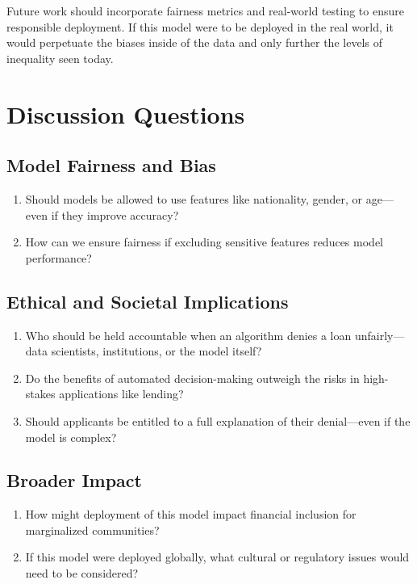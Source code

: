 \documentclass[12pt]{article}
\begin{document}
	Future work should incorporate fairness metrics and real-world testing to ensure responsible deployment. If this model were to be deployed in the real world, it would perpetuate the biases inside of the data and only further the levels of inequality seen today.
	
	\section{Discussion Questions}
	
	\subsection*{Model Fairness and Bias}
	\begin{enumerate}
		\item Should models be allowed to use features like nationality, gender, or age—even if they improve accuracy?
		\item How can we ensure fairness if excluding sensitive features reduces model performance?
	\end{enumerate}
	
	\subsection*{Ethical and Societal Implications}
	\begin{enumerate}
		\item Who should be held accountable when an algorithm denies a loan unfairly—data scientists, institutions, or the model itself?
		\item Do the benefits of automated decision-making outweigh the risks in high-stakes applications like lending?
		\item Should applicants be entitled to a full explanation of their denial—even if the model is complex?
	\end{enumerate}
	
	\subsection*{Broader Impact}
	\begin{enumerate}
		\item How might deployment of this model impact financial inclusion for marginalized communities?
		\item If this model were deployed globally, what cultural or regulatory issues would need to be considered?
	\end{enumerate}
	
\end{document}
